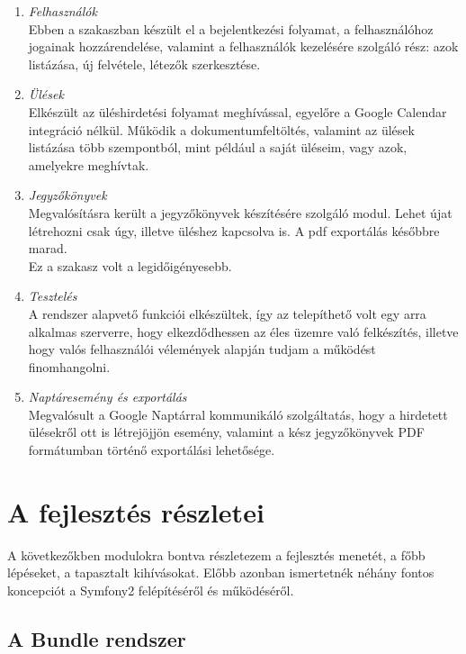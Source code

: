 \documentclass[a4paper,12pt,oneside]{report}
\begin{document}
\begin{enumerate}
  \item \emph{Felhasználók}\\
    Ebben a szakaszban készült el a bejelentkezési folyamat, a felhasználóhoz jogainak hozzárendelése, valamint a felhasználók kezelésére szolgáló rész: azok listázása, új felvétele, létezők szerkesztése.
    
  \item \emph{Ülések}\\
    Elkészült az üléshirdetési folyamat meghívással, egyelőre a Google Calendar integráció nélkül. Működik a dokumentumfeltöltés, valamint az ülések listázása több szempontból, mint például a saját üléseim, vagy azok, amelyekre meghívtak.
    
  \item \emph{Jegyzőkönyvek}\\
    Megvalósításra került a jegyzőkönyvek készítésére szolgáló modul. Lehet újat létrehozni csak úgy, illetve üléshez kapcsolva is. A pdf exportálás későbbre marad.\\
    Ez a szakasz volt a legidőigényesebb.
    
  \item \emph{Tesztelés}\\
    A rendszer alapvető funkciói elkészültek, így az telepíthető volt egy arra alkalmas szerverre, hogy elkezdődhessen az éles üzemre való felkészítés, illetve hogy valós felhasználói vélemények alapján tudjam a működést finomhangolni.
    
  \item \emph{Naptáresemény és exportálás}\\
    Megvalósult a Google Naptárral kommunikáló szolgáltatás, hogy a hirdetett ülésekről ott is létrejöjjön esemény, valamint a kész jegyzőkönyvek PDF formátumban történő exportálási lehetősége.
\end{enumerate}

\section{A fejlesztés részletei}

A következőkben modulokra bontva részletezem a fejlesztés menetét, a főbb lépéseket, a tapasztalt kihívásokat. Előbb azonban ismertetnék néhány fontos koncepciót a Symfony2 felépítéséről és működéséről.

\subsection*{A Bundle rendszer}
\end{document}
